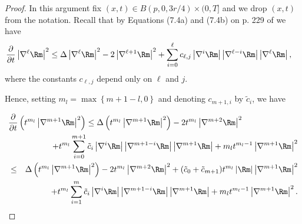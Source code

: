 \begin{proof}
\sketch In this argument fix
$(x,t)\in B(p,0,3r/4)\times (0,T]$ and we drop $(x,t)$ from the
notation. Recall that by Equations (7.4a) and (7.4b) on p. 229 of
\cite{ChowKnopf}  we have
\begin{align}
\frac{\partial}{\partial t}\left\vert \nabla^{\ell
}\Rm\right\vert ^{2} & \leq\Delta\left\vert
\nabla^{\ell }\Rm\right\vert ^{2} -2\left\vert
\nabla^{\ell +1}\Rm\right\vert ^{2}+\sum_{i=0} ^{\ell
}c_{\ell,j}\left\vert \nabla^{i}\Rm\right\vert
\left\vert \nabla^{\ell -i}\Rm\right\vert \left\vert
\nabla^{\ell } \Rm\right\vert, \label{curderfor}
\end{align}
where the constants $c_{\ell,j}$ depend only on $\ell$ and $j$.


Hence, setting $m_l= \max\left\{ m+1-l,0\right\}$ and denoting
$c_{m+1,i}$ by $\tilde c_i$, we have

\begin{eqnarray}
\lefteqn{\frac{\partial}{\partial t}\left(  t^{m_l}\left\vert
\nabla^{m+1}\Rm\right\vert ^{2}\right)
 \leq\Delta\left(  t^{m_l }\left\vert \nabla
^{m+1}\Rm\right\vert ^{2}\right)  -2t^{m_l }
\left\vert \nabla^{m+2}\Rm\right\vert ^{2}}\label{1steqn}\\
& & +t^{m_l  }\sum_{i=0}^{m+1}\tilde c_{i}\left\vert \nabla
^{i}\Rm\right\vert \left\vert
\nabla^{m+1-i}\Rm \right\vert \left\vert
\nabla^{m+1}\Rm\right\vert
 +m_l  t^{m_l -1}\left\vert \nabla^{m+1}\Rm\right\vert ^{2}\nonumber\\
&  \leq & \Delta\left(  t^{m_l }\left\vert \nabla
^{m+1}\Rm\right\vert ^{2}\right)  -2t^{m_l }
\left\vert \nabla^{m+2}\Rm\right\vert ^{2} +(\tilde
c_{0}+\tilde
c_{m+1})t^{m_l}\left\vert\Rm\right\vert\left\vert\nabla^{m+1}\Rm
\right\vert^2\nonumber\\ & &+ t^{m_l }\sum_{i=1}^{m}\tilde
c_{i}\left\vert \nabla
^{i}\Rm\right\vert \left\vert \nabla^{m+1-i}\Rm%
\right\vert \left\vert \nabla^{m+1}\Rm\right\vert
+m_l  t^{m_l -1}\left\vert \nabla^{m+1}\Rm\right\vert
^{2}.\nonumber
\end{eqnarray}


\end{proof}
